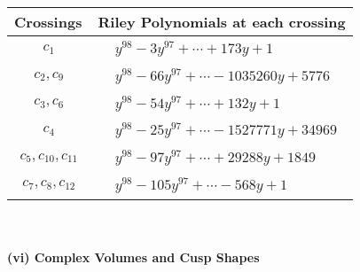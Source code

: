 \documentclass[1p]{elsarticle_modified}
\theoremstyle{definition}
\begin{document}
\begin{tabular}{m{50pt}|m{274pt}}
Crossings & \hspace{64pt}Riley Polynomials at each crossing \\
\hline $$\begin{aligned}c_{1}\end{aligned}$$&$\begin{aligned}
&y^{98}-3 y^{97}+\cdots+173 y+1
\end{aligned}$\\
\hline $$\begin{aligned}c_{2},c_{9}\end{aligned}$$&$\begin{aligned}
&y^{98}-66 y^{97}+\cdots-1035260 y+5776
\end{aligned}$\\
\hline $$\begin{aligned}c_{3},c_{6}\end{aligned}$$&$\begin{aligned}
&y^{98}-54 y^{97}+\cdots+132 y+1
\end{aligned}$\\
\hline $$\begin{aligned}c_{4}\end{aligned}$$&$\begin{aligned}
&y^{98}-25 y^{97}+\cdots-1527771 y+34969
\end{aligned}$\\
\hline $$\begin{aligned}c_{5},c_{10},c_{11}\end{aligned}$$&$\begin{aligned}
&y^{98}-97 y^{97}+\cdots+29288 y+1849
\end{aligned}$\\
\hline $$\begin{aligned}c_{7},c_{8},c_{12}\end{aligned}$$&$\begin{aligned}
&y^{98}-105 y^{97}+\cdots-568 y+1
\end{aligned}$\\
\hline
\end{tabular}\\~\\
\newpage\flushleft \textbf{(vi) Complex Volumes and Cusp Shapes}
\end{document}
